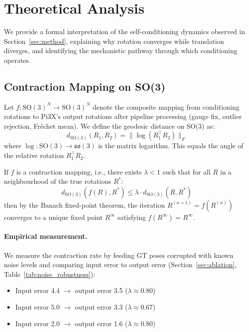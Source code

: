 \section{Theoretical Analysis}
\label{sec:theory}

We provide a formal interpretation of the self-conditioning dynamics observed in Section~\ref{sec:method}, explaining why rotation converges while translation diverges, and identifying the mechanistic pathway through which conditioning operates.

\subsection{Contraction Mapping on SO(3)}

Let $f: \text{SO}(3)^N \rightarrow \text{SO}(3)^N$ denote the composite mapping from conditioning rotations to Pi3X's output rotations after pipeline processing (gauge fix, outlier rejection, Fréchet mean). We define the geodesic distance on SO(3) as:
\begin{equation}
    d_{\text{SO}(3)}(R_1, R_2) = \|\log(R_1^\top R_2)\|_F
\end{equation}
where $\log: \text{SO}(3) \rightarrow \mathfrak{so}(3)$ is the matrix logarithm. This equals the angle of the relative rotation $R_1^\top R_2$.

If $f$ is a contraction mapping, i.e., there exists $\lambda < 1$ such that for all $R$ in a neighbourhood of the true rotations $R^*$:
\begin{equation}
    d_{\text{SO}(3)}(f(R), R^*) \leq \lambda \cdot d_{\text{SO}(3)}(R, R^*)
\end{equation}
then by the Banach fixed-point theorem, the iteration $R^{(n+1)} = f(R^{(n)})$ converges to a unique fixed point $R^\infty$ satisfying $f(R^\infty) = R^\infty$.

\paragraph{Empirical measurement.} We measure the contraction rate by feeding GT poses corrupted with known noise levels and comparing input error to output error (Section~\ref{sec:ablation}, Table~\ref{tab:noise_robustness}):
\begin{itemize}
    \item Input error 4.4\degree{} $\rightarrow$ output error 3.5\degree{} ($\lambda \approx 0.80$)
    \item Input error 5.0\degree{} $\rightarrow$ output error 3.3\degree{} ($\lambda \approx 0.67$)
    \item Input error 2.0\degree{} $\rightarrow$ output error 1.6\degree{} ($\lambda \approx 0.80$)
\end{itemize}

